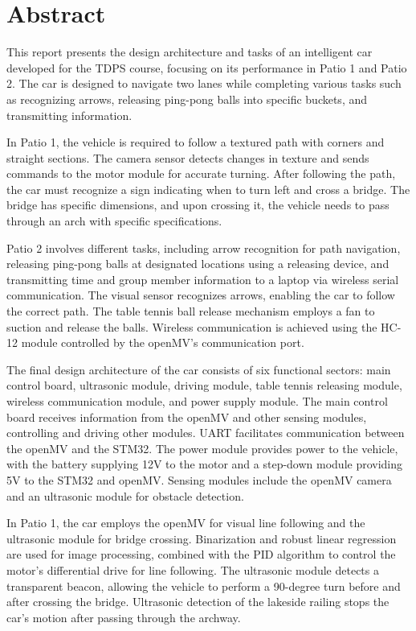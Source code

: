 \documentclass[12pt, a4paper, oneside]{report}
\begin{document}
\rmfamily

	

\section*{Abstract}
This report presents the design architecture and tasks of an intelligent car developed for the TDPS course, focusing on its performance in Patio 1 and Patio 2. The car is designed to navigate two lanes while completing various tasks such as recognizing arrows, releasing ping-pong balls into specific buckets, and transmitting information.

In Patio 1, the vehicle is required to follow a textured path with corners and straight sections. The camera sensor detects changes in texture and sends commands to the motor module for accurate turning. After following the path, the car must recognize a sign indicating when to turn left and cross a bridge. The bridge has specific dimensions, and upon crossing it, the vehicle needs to pass through an arch with specific specifications.

Patio 2 involves different tasks, including arrow recognition for path navigation, releasing ping-pong balls at designated locations using a releasing device, and transmitting time and group member information to a laptop via wireless serial communication. The visual sensor recognizes arrows, enabling the car to follow the correct path. The table tennis ball release mechanism employs a fan to suction and release the balls. Wireless communication is achieved using the HC-12 module controlled by the openMV's communication port.

The final design architecture of the car consists of six functional sectors: main control board, ultrasonic module, driving module, table tennis releasing module, wireless communication module, and power supply module. The main control board receives information from the openMV and other sensing modules, controlling and driving other modules. UART facilitates communication between the openMV and the STM32. The power module provides power to the vehicle, with the battery supplying 12V to the motor and a step-down module providing 5V to the STM32 and openMV. Sensing modules include the openMV camera and an ultrasonic module for obstacle detection.

In Patio 1, the car employs the openMV for visual line following and the ultrasonic module for bridge crossing. Binarization and robust linear regression are used for image processing, combined with the PID algorithm to control the motor's differential drive for line following. The ultrasonic module detects a transparent beacon, allowing the vehicle to perform a 90-degree turn before and after crossing the bridge. Ultrasonic detection of the lakeside railing stops the car's motion after passing through the archway.
\end{document}
